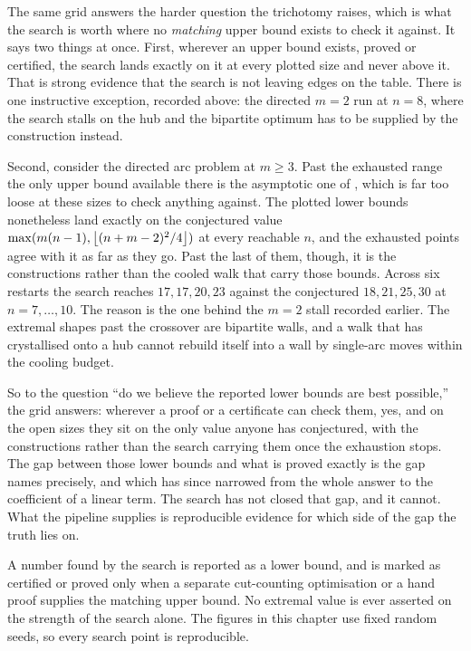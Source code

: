 The same grid answers the harder question the trichotomy raises, which is what the search is worth where no \emph{matching} upper bound exists to check it against. It says two things at once. First, wherever an upper bound exists, proved or certified, the search lands exactly on it at every plotted size and never above it. That is strong evidence that the search is not leaving edges on the table. There is one instructive exception, recorded above: the directed $m = 2$ run at $n = 8$, where the search stalls on the hub and the bipartite optimum has to be supplied by the construction instead.

Second, consider the directed arc problem at $m \ge 3$. Past the exhausted range the only upper bound available there is the asymptotic one of , which is far too loose at these sizes to check anything against. The plotted lower bounds nonetheless land exactly on the conjectured value $\max(m(n-1), \left\lfloor (n+m-2)^2/4 \right\rfloor)$ at every reachable $n$, and the exhausted points agree with it as far as they go. Past the last of them, though, it is the constructions rather than the cooled walk that carry those bounds. Across six restarts the search reaches $17, 17, 20, 23$ against the conjectured $18, 21, 25, 30$ at $n = 7, \dots, 10$. The reason is the one behind the $m = 2$ stall recorded earlier. The extremal shapes past the crossover are bipartite walls, and a walk that has crystallised onto a hub cannot rebuild itself into a wall by single-arc moves within the cooling budget.

So to the question ``do we believe the reported lower bounds are best possible,'' the grid answers: wherever a proof or a certificate can check them, yes, and on the open sizes they sit on the only value anyone has conjectured, with the constructions rather than the search carrying them once the exhaustion stops. The gap between those lower bounds and what is proved exactly is the gap  names precisely, and which has since narrowed from the whole answer to the coefficient of a linear term. The search has not closed that gap, and it cannot. What the pipeline supplies is reproducible evidence for which side of the gap the truth lies on.

\begin{computernote}[Honesty]
A number found by the search is reported as a lower bound, and is marked as certified or proved only when a separate cut-counting optimisation or a hand proof supplies the matching upper bound. No extremal value is ever asserted on the strength of the search alone. The figures in this chapter use fixed random seeds, so every search point is reproducible.
\end{computernote}

